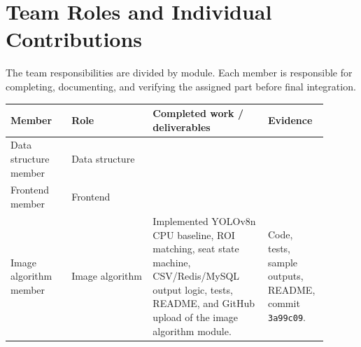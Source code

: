 \section{Team Roles and Individual Contributions}

The team responsibilities are divided by module. Each member is responsible for completing, documenting, and verifying the assigned part before final integration.

\begin{longtable}{|p{0.18\linewidth}|p{0.24\linewidth}|p{0.34\linewidth}|p{0.14\linewidth}|}
\hline
\textbf{Member} & \textbf{Role} & \textbf{Completed work / deliverables} & \textbf{Evidence} \\
\hline
Data structure member & Data structure &  &  \\
\hline
Frontend member & Frontend &  &  \\
\hline
Image algorithm member & Image algorithm & Implemented YOLOv8n CPU baseline, ROI matching, seat state machine, CSV/Redis/MySQL output logic, tests, README, and GitHub upload of the image algorithm module. & Code, tests, sample outputs, README, commit \texttt{3a99c09}. \\
\hline
\end{longtable}

